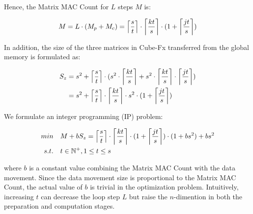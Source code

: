 Hence, the Matrix MAC Count for $L$ steps $M$ is:

\begin{equation}
    \label{eq:gen_6}
    \begin{aligned}
    M = L \cdot (M_p + M_c)
      = \ceil*{\frac{s}{t}} \cdot \ceil*{\frac{kt}{s}} \cdot (1 + \ceil*{\frac{jt}{s}})
    \end{aligned}
    \end{equation}

In addition, the size of the three matrices in Cube-Fx transferred from the global memory is formulated as:

\begin{equation}
    \label{eq:gen_7}
    \begin{aligned}
    S_{z} &= s^2 + \ceil*{\frac{s}{t}} \cdot (s^2 \cdot \ceil*{\frac{kt}{s}} + s^2 \cdot \ceil*{\frac{kt}{s}} \cdot \ceil*{\frac{jt}{s}}) \\
          &= s^2 + \ceil*{\frac{s}{t}} \cdot \ceil*{\frac{kt}{s}} \cdot s^2 \cdot (1 + \ceil*{\frac{jt}{s}})
    \end{aligned}
    \end{equation}


We formulate an integer programming (IP) problem:

\begin{equation}
    \label{eq:optimized_3}
    \begin{aligned}
        min&\quad M + b S_{z} = \ceil*{\frac{s}{t}} \cdot \ceil*{\frac{kt}{s}} \cdot (1 + \ceil*{\frac{jt}{s}}) \cdot (1+ bs ^ 2) + bs ^ 2 \\
        s.t.& \quad t \in \mathbb{N}^{+}, 1 \le t \le s
    \end{aligned}
\end{equation}

where $b$ is a constant value combining the Matrix MAC Count with the data movement. Since the data movement size is proportional to the Matrix MAC Count, the actual value of $b$ is trivial in the optimization problem. Intuitively, increasing $t$ can decrease the loop step $L$ but raise the $n$-dimention in both the preparation and computation stages. 

